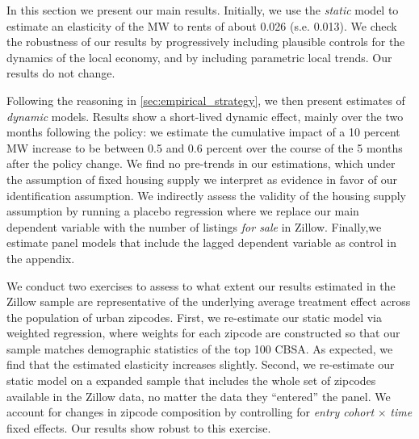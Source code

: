 
In this section we present our main results. Initially, we use the \textit{static} model
to estimate an elasticity of the MW to rents of about 0.026 (s.e. 0.013). We check the
robustness of our results by progressively including plausible controls for the dynamics 
of the local economy, and by including parametric local trends. Our results do not change.

Following the reasoning in \autoref{sec:empirical_strategy}, we then present estimates of 
\textit{dynamic} models. Results show a short-lived dynamic effect, mainly over the two
months following the policy: we estimate the cumulative impact of a 10 percent MW increase 
to be between 0.5 and 0.6 percent over the course of the 5 months after the policy change. 
We find no pre-trends in our estimations, which under the assumption of fixed housing supply 
we interpret as evidence in favor of our identification assumption. We indirectly assess the 
validity of the housing supply assumption by running a placebo regression where we replace 
our main dependent variable with the number of listings \textit{for sale} in Zillow. 
Finally,we estimate panel models that include the lagged dependent variable as control in 
the appendix.






We conduct two exercises to assess to what extent our results estimated in the Zillow sample 
are representative of the underlying average treatment effect across the population of urban
zipcodes. First, we re-estimate our static model via weighted regression, where weights for 
each zipcode are constructed so that our sample matches demographic statistics of the top 100 
CBSA.  As expected, we find that the estimated elasticity increases slightly. Second, we 
re-estimate our static model on a expanded sample that includes the whole set of zipcodes 
available in the Zillow data, no matter the data they ``entered'' the panel. We account for 
changes in zipcode composition by controlling for \textit{entry cohort} $\times$ \textit{time} 
fixed effects. Our results show robust to this exercise.

